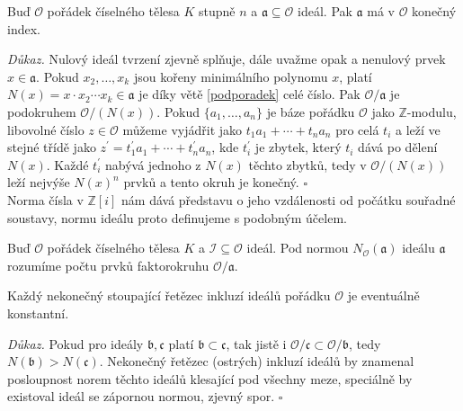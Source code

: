 \documentclass [12pt]{report}
\begin{document}
\begin{veta}
Buď $\mathcal{O}$ pořádek číselného tělesa $K$ stupně $n$ a $\mathfrak{a} \subseteq \mathcal{O}$ ideál. Pak $\mathfrak{a}$ má v $\mathcal{O}$ konečný index.
\end{veta}
\noindent \textit{Důkaz.} Nulový ideál tvrzení zjevně splňuje, dále uvažme opak a nenulový prvek $x \in \mathfrak{a}$. Pokud $x_2,\dots,x_k$ jsou kořeny minimálního polynomu $x$, platí $N(x) = x \cdot x_2 \cdots x_k \in \mathfrak{a}$ je díky větě \ref{podporadek} celé číslo. Pak $\mathcal{O}/\mathfrak{a}$ je podokruhem $\mathcal{O}/(N(x))$. Pokud $\lbrace a_1,\dots,a_n \rbrace$ je báze pořádku $\mathcal{O}$ jako $\mathbb{Z}$-modulu, libovolné číslo $z \in \mathcal{O}$ můžeme vyjádřit jako $t_1 a_1 + \cdots + t_n a_n$ pro celá $t_i$ a leží ve stejné třídě jako $z^\prime = t_1 ^\prime a_1 + \cdots + t_n ^\prime a_n$, kde $t_i ^\prime$ je zbytek, který $t_i$ dává po dělení $N(x)$. Každé $t_i ^\prime$ nabývá jednoho z $N(x)$ těchto zbytků, tedy v $\mathcal{O}/(N(x))$ leží nejvýše $N(x)^n$ prvků a tento okruh je konečný. \hfill $\square$\\

Norma čísla v $\mathbb{Z}[i]$ nám dává představu o jeho vzdálenosti od počátku souřadné soustavy, normu ideálu proto definujeme s podobným účelem.
\begin{definice}
Buď $\mathcal{O}$ pořádek číselného tělesa $K$ a $\mathcal{I} \subseteq \mathcal{O}$ ideál. Pod normou $N_{\mathcal{O}}(\mathfrak{a})$ ideálu $\mathfrak{a}$ rozumíme počtu prvků faktorokruhu $ \mathcal{O}/\mathfrak{a} $.
\end{definice}

\begin{veta}\label{noether}
Každý nekonečný stoupající řetězec inkluzí ideálů pořádku $\mathcal{O}$ je eventuálně konstantní.
\end{veta}
\textit{Důkaz.} Pokud pro ideály $\mathfrak{b},\mathfrak{c}$ platí $\mathfrak{b} \subset \mathfrak{c}$, tak jistě i $\mathcal{O}/\mathfrak{c} \subset \mathcal{O}/\mathfrak{b}$, tedy $N(\mathfrak{b}) > N(\mathfrak{c})$. Nekonečný řetězec (ostrých) inkluzí ideálů by znamenal posloupnost norem těchto ideálů klesající pod všechny meze, speciálně by existoval ideál se zápornou normou, zjevný spor. \hfill $\square$\\

\end{document}

